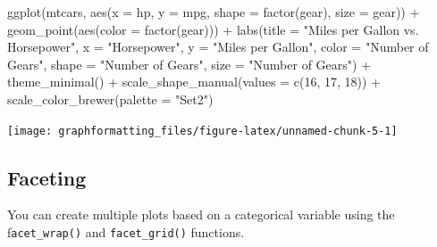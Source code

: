 \documentclass[
]{book}
\newenvironment{Shaded}{\begin{snugshade}}{\end{snugshade}}
\newcommand{\AttributeTok}[1]{\textcolor[rgb]{0.77,0.63,0.00}{#1}}
\newcommand{\DecValTok}[1]{\textcolor[rgb]{0.00,0.00,0.81}{#1}}
\newcommand{\FunctionTok}[1]{\textcolor[rgb]{0.00,0.00,0.00}{#1}}
\newcommand{\NormalTok}[1]{#1}
\newcommand{\SpecialCharTok}[1]{\textcolor[rgb]{0.00,0.00,0.00}{#1}}
\newcommand{\StringTok}[1]{\textcolor[rgb]{0.31,0.60,0.02}{#1}}
\begin{document}
\begin{Shaded}
\begin{Highlighting}[]
\FunctionTok{ggplot}\NormalTok{(mtcars, }\FunctionTok{aes}\NormalTok{(}\AttributeTok{x =}\NormalTok{ hp, }\AttributeTok{y =}\NormalTok{ mpg, }\AttributeTok{shape =} \FunctionTok{factor}\NormalTok{(gear), }\AttributeTok{size =}\NormalTok{ gear)) }\SpecialCharTok{+}
  \FunctionTok{geom\_point}\NormalTok{(}\FunctionTok{aes}\NormalTok{(}\AttributeTok{color =} \FunctionTok{factor}\NormalTok{(gear))) }\SpecialCharTok{+}
  \FunctionTok{labs}\NormalTok{(}\AttributeTok{title =} \StringTok{"Miles per Gallon vs. Horsepower"}\NormalTok{,}
       \AttributeTok{x =} \StringTok{"Horsepower"}\NormalTok{,}
       \AttributeTok{y =} \StringTok{"Miles per Gallon"}\NormalTok{,}
       \AttributeTok{color =} \StringTok{"Number of Gears"}\NormalTok{,}
       \AttributeTok{shape =} \StringTok{"Number of Gears"}\NormalTok{,}
       \AttributeTok{size =} \StringTok{"Number of Gears"}\NormalTok{) }\SpecialCharTok{+}
  \FunctionTok{theme\_minimal}\NormalTok{() }\SpecialCharTok{+}
  \FunctionTok{scale\_shape\_manual}\NormalTok{(}\AttributeTok{values =} \FunctionTok{c}\NormalTok{(}\DecValTok{16}\NormalTok{, }\DecValTok{17}\NormalTok{, }\DecValTok{18}\NormalTok{)) }\SpecialCharTok{+}
  \FunctionTok{scale\_color\_brewer}\NormalTok{(}\AttributeTok{palette =} \StringTok{"Set2"}\NormalTok{)}
\end{Highlighting}
\end{Shaded}

\texttt{[image: graphformatting\_files/figure-latex/unnamed-chunk-5-1]}

\hypertarget{faceting-1}{%
\subsection{Faceting}\label{faceting-1}}

You can create multiple plots based on a categorical variable using the f\texttt{acet\_wrap()} and \texttt{facet\_grid()} functions.
\end{document}
